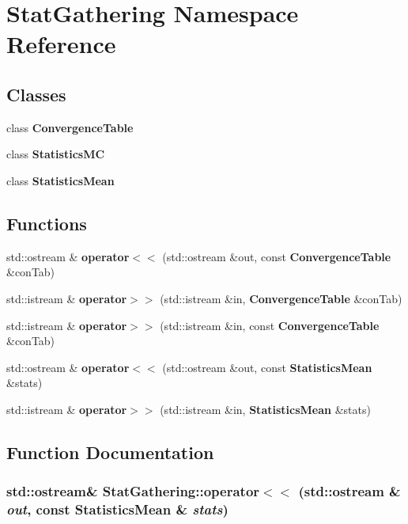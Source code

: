 \section{StatGathering Namespace Reference}
\label{namespaceStatGathering}


\subsection*{Classes}
\begin{CompactItemize}
\item 
class {\bf ConvergenceTable}
\item 
class {\bf StatisticsMC}
\item 
class {\bf StatisticsMean}
\end{CompactItemize}
\subsection*{Functions}
\begin{CompactItemize}
\item 
std::ostream \& {\bf operator$<$$<$} (std::ostream \&out, const {\bf ConvergenceTable} \&conTab)
\item 
std::istream \& {\bf operator$>$$>$} (std::istream \&in, {\bf ConvergenceTable} \&conTab)
\item 
std::istream \& {\bf operator$>$$>$} (std::istream \&in, const {\bf ConvergenceTable} \&conTab)
\item 
std::ostream \& {\bf operator$<$$<$} (std::ostream \&out, const {\bf StatisticsMean} \&stats)
\item 
std::istream \& {\bf operator$>$$>$} (std::istream \&in, {\bf StatisticsMean} \&stats)
\end{CompactItemize}


\subsection{Function Documentation}
\subsubsection{\setlength{\rightskip}{0pt plus 5cm}std::ostream\& StatGathering::operator$<$$<$ (std::ostream \& {\em out}, const StatisticsMean \& {\em stats})}\label{namespaceStatGathering_633e5a7991e58ca433da34b4cd49ecd2}




